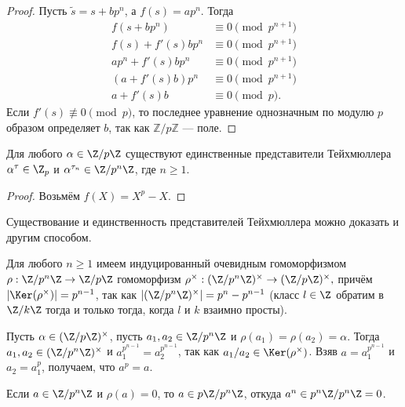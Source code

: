 \documentclass[
	extrafontsizes,
	11pt,
	hyphens,
]{memoir}
\begin{document}
\begin{proof}
Пусть \(\tilde{s} = s + b p^n\), а \(f(s) = a p^n\). Тогда
\begin{align*}
f(s+bp^n)       &\equiv 0  \pmod {p^{n+1}}\\
f(s)+f'(s)bp^n  &\equiv 0  \pmod {p^{n+1}}\\
ap^n+f'(s)bp^n  &\equiv 0  \pmod {p^{n+1}}\\
(a+f'(s)b)p^n   &\equiv 0  \pmod {p^{n+1}}\\
a+f'(s)b        &\equiv 0  \pmod p.
\end{align*}
Если \(f'(s) \not\equiv 0 \pmod p\), то последнее уравнение однозначным по модулю \(p\) образом определяет \(b\), так как \(\mathbb{Z} / p \mathbb{Z}\) --- поле.
\end{proof}

\begin{corollary}
Для любого
\(\alpha \in \Z/p\Z\)
существуют единственные представители Тейхмюллера \(\alpha^\tau \in \Z_p\) и \(\alpha^{\tau_n} \in \Z/p^n\Z\), где \(n \geq 1\).
\end{corollary}

\begin{proof}
Возьмём \(f(X) = X^p - X\).
\end{proof}

\begin{remark}
Существование и единственность представителей Тейхмюллера можно доказать и другим способом.

Для любого \(n \geq 1\) имеем индуцированный очевидным гомоморфизмом
\(\rho : \Z/p^n\Z \to \Z/p\Z\) гомоморфизм
\(\rho^\times: (\Z/p^n\Z)^\times \to (\Z/p\Z)^\times,\)
причём \(\lvert\Ker(\rho^\times)\rvert = p^{n-1}\), так как \(\lvert(\Z/p^n\Z)^\times\rvert = p^n - p^{n-1}\) (класс \(l \in \Z\) обратим в \(\Z/k\Z\) тогда и только тогда, когда \(l\) и \(k\) взаимно просты).

Пусть \(\alpha \in (\Z/p\Z)^\times\), пусть \(a_1,a_2 \in \Z/p^n\Z\) и \(\rho(a_1) = \rho(a_2) = \alpha\). Тогда \(a_1,a_2 \in (\Z/p^n\Z)^\times\) и \(a_1^{p^{n-1}} = a_2^{p^{n-1}}\), так как \(a_1/a_2 \in \Ker(\rho^\times)\). Взяв \(a = a_1^{p^{n-1}}\) и \(a_2 = a_1^p\), получаем, что \(a^p = a\).

Если \(a \in \Z/p^n\Z\) и \(\rho(a)=0\), то
\(a \in p\Z/p^n\Z\), откуда \(a^{n} \in p^n\Z/p^n\Z = 0\).
\end{remark}
\end{document}
